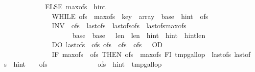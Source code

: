 \begin{isabellebody}
\ \ \ \ \ \ \ \ \ \ \ \ ELSE\ {\isasymacute}max{\isacharunderscore}ofs\ {\isacharcolon}{\isacharequal}{\isacharequal}\ {\isasymacute}hint\ {\isacharplus}\ {}{\isacharsemicolon}{\isacharsemicolon}\isanewline
\ \ \ \ \ \ \ \ \ \ \ \ \ \ WHILE\ {\isasymacute}ofs\ {\isacharless}\ {\isasymacute}max{\isacharunderscore}ofs\ {\isasymand}\ {\isasymacute}key\ {\isasymle}\ {\isasymacute}array\ {\isacharbang}\ {\isacharparenleft}{\isasymacute}base\ {\isacharplus}\ {\isasymacute}hint\ {\isacharminus}\ {\isasymacute}ofs{\isacharparenright}\ \isanewline
\ \ \ \ \ \ \ \ \ \ \ \ \ \ INV\ {\isasymlbrace}\ {\isasymacute}ofs{\isachargreater}{}\ {\isasymand}\ {\isasymacute}last{\isacharunderscore}ofs{\isasymge}{}\ {\isasymand}\ {\isasymacute}last{\isacharunderscore}ofs{\isacharless}{\isasymacute}ofs\ {\isasymand}\ {\isasymacute}last{\isacharunderscore}ofs{\isacharless}{\isasymacute}max{\isacharunderscore}ofs\ {\isasymand}\isanewline
\ \ \ \ \ \ \ \ \ \ \ \ \ \ \ \ \ \ \ \ {\isasymacute}base\ {\isacharequal}\ \isactrlbsup {\isasymsigma}\isactrlesup base\ {\isasymand}\ \ {\isasymacute}len\ {\isacharequal}\ \isactrlbsup {\isasymsigma}\isactrlesup len\ {\isasymand}\ {\isasymacute}hint\ {\isacharequal}\ \isactrlbsup {\isasymsigma}\isactrlesup hint\ {\isasymand}\ {\isasymacute}hint{\isacharless}{\isasymacute}len\ {\isasymrbrace}\isanewline
\ \ \ \ \ \ \ \ \ \ \ \ \ \ DO\ {\isasymacute}last{\isacharunderscore}ofs\ {\isacharcolon}{\isacharequal}{\isacharequal}\ {\isasymacute}ofs{\isacharsemicolon}{\isacharsemicolon}\ {\isasymacute}ofs\ {\isacharcolon}{\isacharequal}{\isacharequal}\ {\isasymacute}ofs\ {\isacharplus}\ {\isasymacute}ofs\ {\isacharplus}\ {}\ OD{\isacharsemicolon}{\isacharsemicolon}\isanewline
\ \ \ \ \ \ \ \ \ \ \ \ \ \ IF\ {\isasymacute}max{\isacharunderscore}ofs\ {\isacharless}\ {\isasymacute}ofs\ THEN\ {\isasymacute}ofs\ {\isacharcolon}{\isacharequal}{\isacharequal}\ {\isasymacute}max{\isacharunderscore}ofs\ FI{\isacharsemicolon}{\isacharsemicolon}\ {\isasymacute}tmp{\isacharunderscore}gallop\ {\isacharcolon}{\isacharequal}{\isacharequal}\ {\isasymacute}last{\isacharunderscore}ofs{\isacharsemicolon}{\isacharsemicolon}\ {\isasymacute}last{\isacharunderscore}ofs\ {\isacharcolon}{\isacharequal}{\isacharequal}\ {\isasymacute}hint\ {\isacharplus}\ {}\ {\isacharminus}\ {\isasymacute}ofs{\isacharsemicolon}{\isacharsemicolon}\isanewline
\ \ \ \ \ \ \ \ \ \ \ \ \ \ {\isasymacute}ofs\ {\isacharcolon}{\isacharequal}{\isacharequal}\ {\isasymacute}hint\ {\isacharminus}\ {\isasymacute}tmp{\isacharunderscore}gallop\isanewline

\end{isabellebody}
